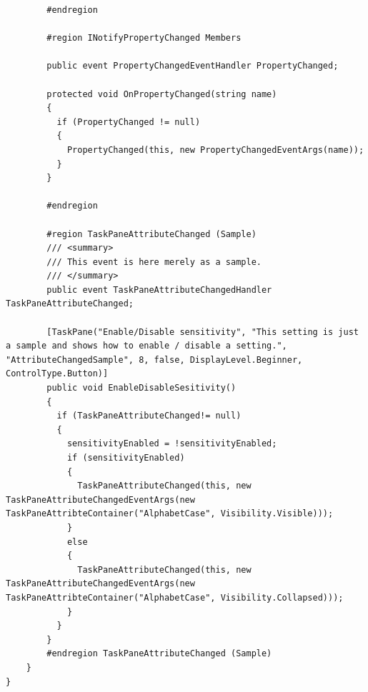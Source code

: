 \begin{lstlisting}
        #endregion

        #region INotifyPropertyChanged Members

        public event PropertyChangedEventHandler PropertyChanged;

        protected void OnPropertyChanged(string name)
        {
          if (PropertyChanged != null)
          {
            PropertyChanged(this, new PropertyChangedEventArgs(name));
          }
        }

        #endregion

        #region TaskPaneAttributeChanged (Sample)
        /// <summary>
        /// This event is here merely as a sample.
        /// </summary>
        public event TaskPaneAttributeChangedHandler TaskPaneAttributeChanged;

        [TaskPane("Enable/Disable sensitivity", "This setting is just a sample and shows how to enable / disable a setting.", "AttributeChangedSample", 8, false, DisplayLevel.Beginner, ControlType.Button)]
        public void EnableDisableSesitivity()
        {
          if (TaskPaneAttributeChanged!= null)
          {
            sensitivityEnabled = !sensitivityEnabled;
            if (sensitivityEnabled)
            {
              TaskPaneAttributeChanged(this, new TaskPaneAttributeChangedEventArgs(new TaskPaneAttribteContainer("AlphabetCase", Visibility.Visible)));
            }
            else
            {
              TaskPaneAttributeChanged(this, new TaskPaneAttributeChangedEventArgs(new TaskPaneAttribteContainer("AlphabetCase", Visibility.Collapsed)));
            }
          }
        }
        #endregion TaskPaneAttributeChanged (Sample)
    }
}
\end{lstlisting}